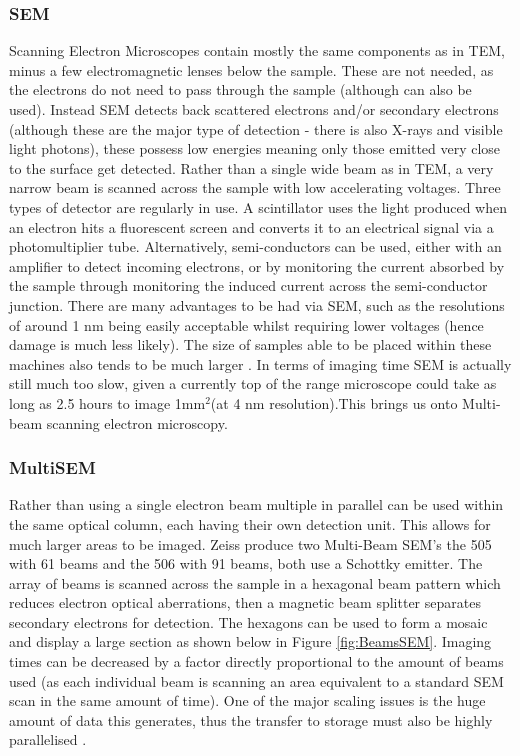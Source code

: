 \documentclass[a4paper, 11pt]{article}
\numberwithin{equation}{section}
\begin{document}
\subsubsection{SEM}
Scanning Electron Microscopes contain mostly the same components as in TEM, minus a few electromagnetic lenses below the sample. These are not needed, as the electrons do not need to pass through the sample (although can also be used). Instead SEM detects back scattered electrons and/or secondary electrons (although these are the major type of detection - there is also X-rays and visible light photons), these possess low energies meaning only those emitted very close to the surface get detected. Rather than a single wide beam as in TEM, a very narrow beam is scanned across the sample with low accelerating voltages. Three types of detector are regularly in use. A scintillator uses the light produced when an electron hits a fluorescent screen and converts it to an electrical signal via a photomultiplier tube. Alternatively, semi-conductors can be used, either with an amplifier to detect incoming electrons, or by monitoring the current absorbed by the sample through monitoring the induced current across the semi-conductor junction. There are many advantages to be had via SEM, such as the resolutions of around 1  nm being easily acceptable whilst requiring lower voltages (hence damage is much less likely). The size of samples able to be placed within these machines also tends to be much larger \cite{beniac2010introduction}. In terms of imaging time SEM is actually still much too slow, given a currently top of the range microscope could take as long as 2.5 hours to image 1mm$^2$(at 4  nm resolution)\cite{ZeissPres}.This brings us onto Multi-beam scanning electron microscopy.



\subsubsection{MultiSEM}
\label{recording_EM}
Rather than using a single electron beam multiple in parallel can be used within the same optical column, each having their own detection unit. This allows for much larger areas to be imaged. Zeiss produce two Multi-Beam SEM's the 505 with 61 beams and the 506 with 91 beams, both use a Schottky emitter. The array of beams is scanned across the sample in a hexagonal beam pattern which reduces electron optical aberrations, then a magnetic beam splitter separates secondary electrons for detection. The hexagons can be used to form a mosaic and display a large section as shown below in Figure \ref{fig:BeamsSEM}. Imaging times can be decreased by a factor directly proportional to the amount of beams used (as each individual beam is scanning an area equivalent to a standard SEM scan in the same amount of time). One of the major scaling issues is the huge amount of data this generates, thus the transfer to storage must also be highly parallelised \cite{eberle2015multiple}. \\
\end{document}
